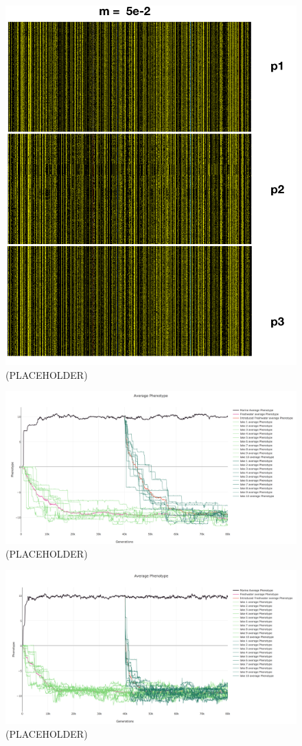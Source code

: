 \documentclass{article}
\begin{document}
\begin{figure}[h!tb]
	\begin{center}
  		\includegraphics[width=0.7\linewidth]{plotlyPlots/Haplo5e-2.png}
  		\caption{(PLACEHOLDER)
		}
  		\label{fig:Haplo4}
	\end{center}
\end{figure}

\begin{figure}[h!tb]
	\begin{center}
  		\includegraphics[width=0.7\linewidth]{plotlyPlots/PhenotypeThroughout5e-5.png}
  		\caption{ (PLACEHOLDER)
		}
  		\label{fig:phenotype_ts1}
	\end{center}
\end{figure}

\begin{figure}[h!tb]
	\begin{center}
  		\includegraphics[width=0.7\linewidth]{plotlyPlots/PhenotypeThroughout5e-4.png}
  		\caption{(PLACEHOLDER)
		}
  		\label{fig:phenotype_ts2}
	\end{center}
\end{figure}
\end{document}
